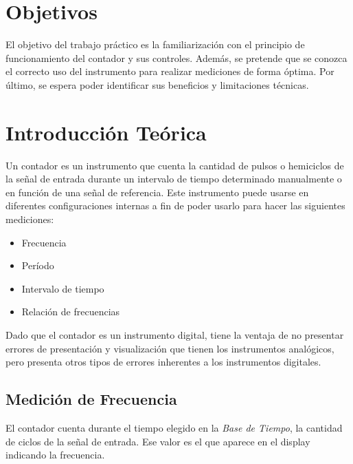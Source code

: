 \documentclass{article}
\begin{document}
\section{Objetivos}

	El objetivo del trabajo práctico es la familiarización con el principio de funcionamiento del contador y sus controles. Además, se pretende que se conozca el correcto uso del instrumento para realizar mediciones de forma óptima. Por último, se espera poder identificar sus beneficios y limitaciones técnicas.
\bigskip\bigskip




\section{Introducción Teórica}
	
	Un contador es un instrumento que cuenta la cantidad de pulsos o hemiciclos de la señal de entrada durante un intervalo de tiempo determinado manualmente o en función de una señal de referencia. Este instrumento puede usarse en diferentes configuraciones internas a fin de poder usarlo para hacer las siguientes mediciones:


\begin{itemize}
	\itemsep=3pt \topsep=0pt \partopsep=0pt \parskip=0pt \parsep=0pt
	
	\item Frecuencia
	\item Período
	\item Intervalo de tiempo
	\item Relación de frecuencias
\end{itemize}

	Dado que el contador es un instrumento digital, tiene la ventaja de no presentar errores de presentación y visualización que tienen los instrumentos analógicos, pero presenta otros tipos de errores inherentes a los instrumentos digitales.
\bigskip\bigskip



\subsection{Medición de Frecuencia}

	El contador cuenta durante el tiempo elegido en la \textit{Base de Tiempo}, la cantidad de ciclos de la señal de entrada. Ese valor es el que aparece en el display indicando la frecuencia.
\bigskip\bigskip
\end{document}
